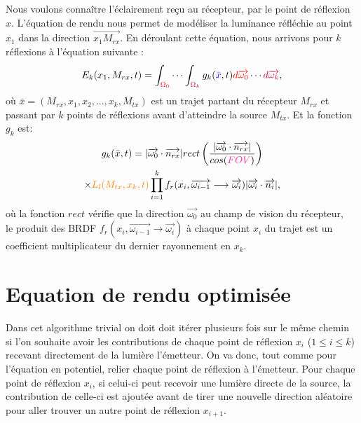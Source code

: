 Nous voulons connaître l'éclairement reçu au récepteur, par le point de réflexion $x$. L'équation de rendu nous permet de modéliser la luminance réfléchie au point $x_1$ dans la direction $\overrightarrow{x_1 M_{rx}}$. En déroulant cette équation, nous arrivons pour $k$ réflexions à l'équation suivante :
\large \begin{equation}
    E_k(x_1, M_{rx}, t) =
        \int_{\textcolor{red}{\Omega_0}}
            \cdots
            \int_{\textcolor{purple}{\Omega_k}}
                g_k(\textcolor{blue}{\bar{x}}, t)
            \textcolor{red}{d\overrightarrow{\omega_0}}
            \cdots
        \textcolor{purple}{d\overrightarrow{\omega_k}}
,\end{equation} \normalsize
où $\bar{x} = (M_{rx}, x_1, x_2, ... , x_k, M_{tx})$ est un trajet partant du récepteur $M_{rx}$ et passant par $k$ points de réflexions avant d'atteindre la source $M_{tx}$. Et la fonction $g_k$ est:
\large \begin{multline}
    g_k(\bar{x}, t) =
        | \overrightarrow{\omega_0} \cdot \overrightarrow{n_{rx}} |
        rect\left(\frac
            {| \overrightarrow{\omega_0} \cdot \overrightarrow{n_{rx}} |}
            {cos(\textcolor{Rhodamine}{FOV})}
        \right) \\
        \times
        \textcolor{BurntOrange}{L_l(M_{tx}, x_k, t)}
        \prod\limits_{i=1}^k
            f_r(x_i, \overrightarrow{\omega_{i-1}} \longrightarrow \overrightarrow{\omega_{i}})
            | \overrightarrow{\omega_i} \cdot \overrightarrow{n_i} |
,\end{multline} \normalsize
où la fonction $rect$ vérifie que la direction $\overrightarrow{\omega_0}$ au champ de vision du récepteur, \\
le produit des BRDF $f_r(x_i, \overrightarrow{\omega_{i-1}} \longrightarrow \overrightarrow{\omega_{i}})$ à chaque point $x_i$ du trajet est un coefficient multiplicateur du dernier rayonnement en $x_k$.


\section{Equation de rendu optimisée}

Dans cet algorithme trivial on doit doit itérer plusieurs fois sur le même chemin si l'on souhaite avoir les contributions de chaque point de réflexion $x_i$ ($1 \leq i \leq k$) recevant directement de la lumière l'émetteur. On va donc, tout comme pour l'équation en potentiel, relier chaque point de réflexion à l'émetteur. Pour chaque point de réflexion $x_i$, si celui-ci peut recevoir une lumière directe de la source, la contribution de celle-ci est ajoutée avant de tirer une nouvelle direction aléatoire pour aller trouver un autre point de réflexion $x_{i+1}$.\newline\par

